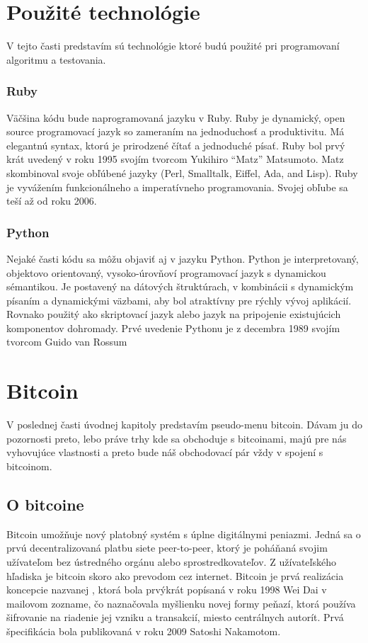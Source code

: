 \section{Použité technológie} 
V tejto časti predstavím sú technológie ktoré budú použité pri programovaní algoritmu a testovania. 
\subsubsection{Ruby} 
Väčšina kódu bude naprogramovaná jazyku v Ruby. Ruby je dynamický, open source programovací jazyk so zameraním na jednoduchosť a produktivitu. Má elegantnú syntax, ktorú je prirodzené čítať a jednoduché písať. Ruby bol prvý krát uvedený v roku 1995 svojím tvorcom Yukihiro “Matz” Matsumoto. Matz skombinoval svoje obľúbené jazyky (Perl, Smalltalk, Eiffel, Ada, and Lisp). Ruby je vyvážením funkcionálneho a imperatívneho programovania. Svojej obľube sa teší až od roku 2006.\cite{Rb} 
\subsubsection{Python} 
Nejaké časti kódu sa môžu objaviť aj v jazyku Python. Python je interpretovaný, objektovo orientovaný, vysoko-úrovňoví programovací jazyk s dynamickou sémantikou. Je postavený na dátových štruktúrach, v kombinácii s dynamickým písaním a dynamickými väzbami, aby bol atraktívny pre rýchly vývoj aplikácií. Rovnako použitý ako skriptovací jazyk alebo  jazyk na pripojenie existujúcich komponentov dohromady. Prvé uvedenie Pythonu je z decembra 1989 svojím tvorcom Guido van Rossum\cite{Pt} 
\section{Bitcoin} 
V poslednej časti úvodnej kapitoly predstavím pseudo-menu bitcoin. Dávam ju do pozornosti preto, lebo práve trhy kde sa obchoduje s bitcoinami, majú pre nás vyhovujúce vlastnosti a preto bude náš obchodovací pár vždy v spojení s bitcoinom. 
\subsection{O bitcoine} 
Bitcoin umožňuje nový platobný systém s úplne digitálnymi peniazmi. Jedná sa o prvú decentralizovaná platbu siete peer-to-peer, ktorý je poháňaná svojim užívateľom bez ústredného orgánu alebo sprostredkovateľov. Z užívateľského hľadiska je bitcoin skoro ako prevodom cez internet. Bitcoin je prvá realizácia koncepcie nazvanej , ktorá bola prvýkrát popísaná v roku 1998 Wei Dai v  mailovom zozname, čo naznačovala myšlienku novej formy peňazí, ktorá používa šifrovanie na riadenie jej vzniku a transakcií, miesto centrálnych autorít.  Prvá špecifikácia bola publikovaná v roku 2009  Satoshi Nakamotom. 
